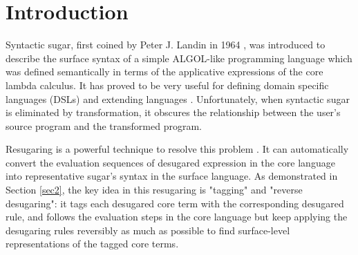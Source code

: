 \section{Introduction}









Syntactic sugar, first coined by Peter J. Landin in 1964 \cite{syntacticsugar}, was introduced to describe the surface syntax of a simple ALGOL-like programming language which was defined semantically in terms of the applicative expressions of the core lambda calculus. It has proved to be very useful for defining domain specific languages (DSLs) and extending languages \cite{FellFFKBMT18,CulpFFK19}.
Unfortunately, when syntactic sugar is eliminated by transformation, it obscures the relationship between the user’s source program and the transformed program.



Resugaring is a powerful technique to resolve this problem \cite{resugaring,hygienic}. It  can automatically convert the evaluation sequences of desugared expression in the core language into representative sugar's syntax in the surface language.
As demonstrated in Section \ref{sec2},
the key idea in this resugaring is "tagging" and "reverse desugaring": it tags each desugared core term with the corresponding desugared rule, and follows the evaluation steps in the core language but keep applying the desugaring rules reversibly as much as possible to find surface-level representations of the tagged core terms.

